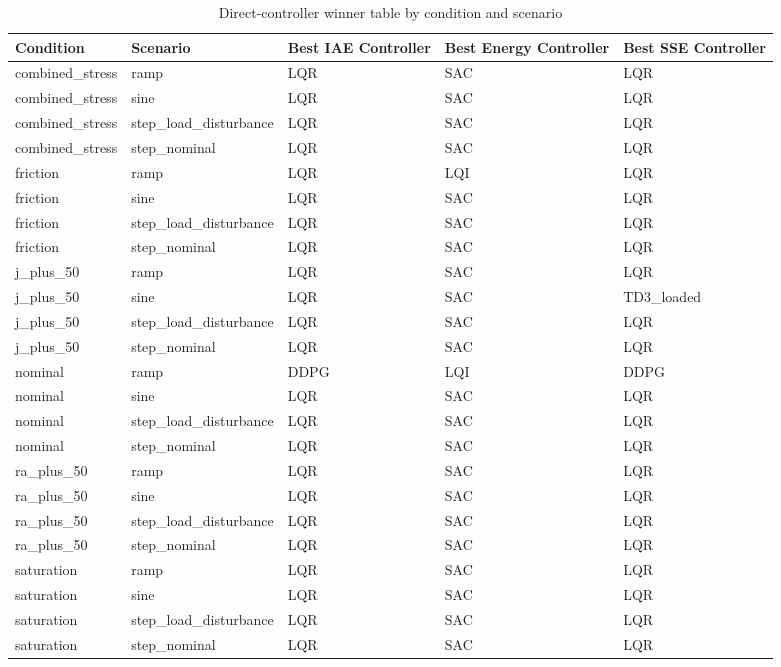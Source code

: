 \documentclass[conference]{IEEEtran}
\begin{document}
\begin{table}[!t]
\caption{Direct-controller winner table by condition and scenario}
\label{tab:direct_winner_table}
\centering
\scriptsize
\setlength{\tabcolsep}{4pt}
\renewcommand{\arraystretch}{1.08}
\begin{tabular}{lllll}
\hline
Condition & Scenario & Best IAE Controller & Best Energy Controller & Best SSE Controller \\
\hline
combined\_stress & ramp & LQR & SAC & LQR \\
combined\_stress & sine & LQR & SAC & LQR \\
combined\_stress & step\_load\_disturbance & LQR & SAC & LQR \\
combined\_stress & step\_nominal & LQR & SAC & LQR \\
friction & ramp & LQR & LQI & LQR \\
friction & sine & LQR & SAC & LQR \\
friction & step\_load\_disturbance & LQR & SAC & LQR \\
friction & step\_nominal & LQR & SAC & LQR \\
j\_plus\_50 & ramp & LQR & SAC & LQR \\
j\_plus\_50 & sine & LQR & SAC & TD3\_loaded \\
j\_plus\_50 & step\_load\_disturbance & LQR & SAC & LQR \\
j\_plus\_50 & step\_nominal & LQR & SAC & LQR \\
nominal & ramp & DDPG & LQI & DDPG \\
nominal & sine & LQR & SAC & LQR \\
nominal & step\_load\_disturbance & LQR & SAC & LQR \\
nominal & step\_nominal & LQR & SAC & LQR \\
ra\_plus\_50 & ramp & LQR & SAC & LQR \\
ra\_plus\_50 & sine & LQR & SAC & LQR \\
ra\_plus\_50 & step\_load\_disturbance & LQR & SAC & LQR \\
ra\_plus\_50 & step\_nominal & LQR & SAC & LQR \\
saturation & ramp & LQR & SAC & LQR \\
saturation & sine & LQR & SAC & LQR \\
saturation & step\_load\_disturbance & LQR & SAC & LQR \\
saturation & step\_nominal & LQR & SAC & LQR \\
\hline
\end{tabular}
\end{table}
\FloatBarrier
\end{document}
